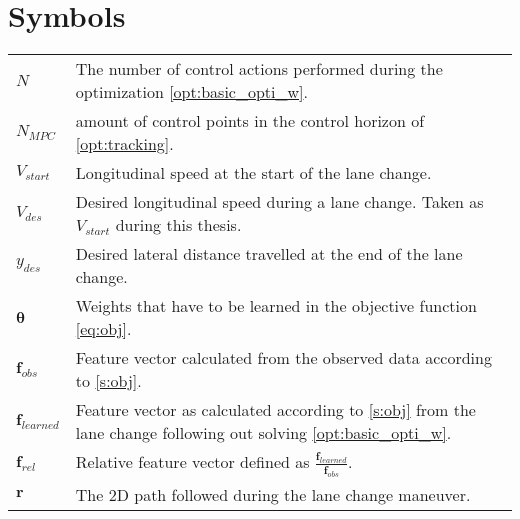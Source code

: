 \documentclass[master=elt,masteroption=eg,english]{kulemt}
\begin{document}
\section*{Symbols}
\begin{flushleft}
  \renewcommand{\arraystretch}{1.1}
  \begin{tabularx}{\textwidth}{@{}p{12mm}X@{}}
    $N$    &  The number of control actions performed during the optimization \ref{opt:basic_opti_w}. \\
    $N_{MPC}$ & amount of control points in the control horizon of \ref{opt:tracking}.\\
    $V_{start}$ & Longitudinal speed at the start of the lane change.\\
    $V_{des}$ & Desired longitudinal speed during a lane change. Taken as $V_{start}$ during this thesis.\\
   $y_{des}$   & Desired lateral distance travelled at the end of the lane change.\\
    $\bm{\theta}$ & Weights that have to be learned in the objective function \ref{eq:obj}.\\
    $\bm{f}_{obs}$ & Feature vector calculated from the observed data according to \ref{s:obj}.\\
    $\bm{f}_{learned}$ & Feature vector as calculated according to \ref{s:obj} from the lane change following out solving \ref{opt:basic_opti_w}.\\
    $\bm{f}_{rel}$ & Relative feature vector defined as $\frac{\bm{f}_{learned}}{\bm{f}_{obs}}$.\\
    $\bm{r}$ & The 2D path followed during the lane change maneuver.   
    
     
    
  \end{tabularx}
\end{flushleft}

\mainmatter










\appendixpage*          %
\appendix






\backmatter


%
\end{document}
